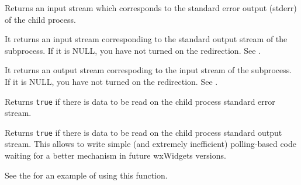 \label{wxprocessgeterrorstream}


Returns an input stream which corresponds to the standard error output (stderr)
of the child process.

\label{wxprocessgetinputstream}


It returns an input stream corresponding to the standard output stream of the
subprocess. If it is NULL, you have not turned on the redirection.
See .

\label{wxprocessgetoutputstream}


It returns an output stream correspoding to the input stream of the subprocess.
If it is NULL, you have not turned on the redirection.
See .

\label{wxprocessiserroravailable}


Returns {\tt true} if there is data to be read on the child process standard
error stream.



\label{wxprocessisinputavailable}


Returns {\tt true} if there is data to be read on the child process standard
output stream. This allows to write simple (and extremely inefficient)
polling-based code waiting for a better mechanism in future wxWidgets versions.

See the  for an example of using this
function.



\label{wxprocessisinputopened}


